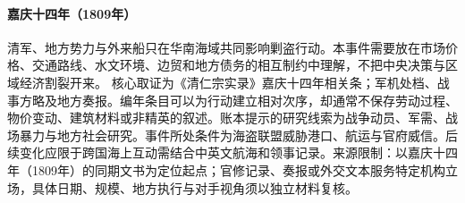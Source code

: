 \hypertarget{civic:EQ-1809-SOUTH-CHINA-SEA-CAMPAIGN}{}\paragraph{嘉庆十四年（1809年）}清军、地方势力与外来船只在华南海域共同影响剿盗行动。本事件需要放在市场价格、交通路线、水文环境、边贸和地方债务的相互制约中理解，不把中央决策与区域经济割裂开来。 核心取证为《清仁宗实录》嘉庆十四年相关条；军机处档、战事方略及地方奏报。编年条目可以为行动建立相对次序，却通常不保存劳动过程、物价变动、建筑材料或非精英的叙述。账本提示的研究线索为战争动员、军需、战场暴力与地方社会研究。事件所处条件为海盗联盟威胁港口、航运与官府威信。后续变化应限于跨国海上互动需结合中英文航海和领事记录。来源限制：以嘉庆十四年（1809年）的同期文书为定位起点；官修记录、奏报或外交文本服务特定机构立场，具体日期、规模、地方执行与对手视角须以独立材料复核。
